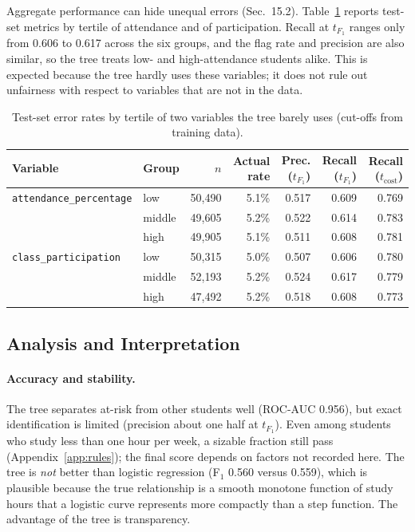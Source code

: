 \documentclass[12pt,a4paper]{article}
\theoremstyle{definition}
\begin{document}
Aggregate performance can hide unequal errors (Sec.~15.2). Table~\ref{tab:sub} reports test-set metrics by tertile of attendance and of participation. Recall at $t_{F_1}$ ranges only from 0.606 to 0.617 across the six groups, and the flag rate and precision are also similar, so the tree treats low- and high-attendance students alike. This is expected because the tree hardly uses these variables; it does not rule out unfairness with respect to variables that are not in the data.

\begin{table}[h!]
\centering
\small
\caption{Test-set error rates by tertile of two variables the tree barely uses (cut-offs from training data).}
\label{tab:sub}
\begin{tabular}{llrrrrr}
\toprule
Variable & Group & $n$ & Actual rate & Prec. ($t_{F_1}$) & Recall ($t_{F_1}$) & Recall ($t_{\mathrm{cost}}$) \\
\midrule
\texttt{attendance\_percentage} & low & 50{,}490 & 5.1\% & 0.517 & 0.609 & 0.769 \\
 & middle & 49{,}605 & 5.2\% & 0.522 & 0.614 & 0.783 \\
 & high & 49{,}905 & 5.1\% & 0.511 & 0.608 & 0.781 \\
\texttt{class\_participation} & low & 50{,}315 & 5.0\% & 0.507 & 0.606 & 0.780 \\
 & middle & 52{,}193 & 5.2\% & 0.524 & 0.617 & 0.779 \\
 & high & 47{,}492 & 5.2\% & 0.518 & 0.608 & 0.773 \\
\bottomrule
\end{tabular}
\end{table}


\subsection{Analysis and Interpretation}

\paragraph{Accuracy and stability.} The tree separates at-risk from other students well (ROC-AUC 0.956), but exact identification is limited (precision about one half at $t_{F_1}$). Even among students who study less than one hour per week, a sizable fraction still pass (Appendix~\ref{app:rules}); the final score depends on factors not recorded here. The tree is \emph{not} better than logistic regression (F$_1$ 0.560 versus 0.559), which is plausible because the true relationship is a smooth monotone function of study hours that a logistic curve represents more compactly than a step function. The advantage of the tree is transparency.
\end{document}

